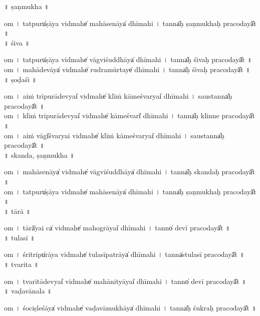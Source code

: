 \documentclass[parskip, DIV=14]{scrartcl}
\begin{document}
\vspace{0.201cm} ॥   ṣaṇmukha  ॥ \par
  om  । tatpuru̍ṣāya vi॒dmahe̍ mahāse॒nāya̍ dhīmahi  ।  tanna̍ḥ ṣaṇmukhaḥ praco॒dayā̎t ॥ \\

\vspace{0.201cm} ॥   śiva  ॥ \par
  om  । tatpuru̍ṣāya vi॒dmahe̍ vāgviśu॒ddhāya̍ dhīmahi  ।  tanna̍ḥ śivaḥ praco॒dayā̎t ॥ \\
  om  । ma॒hā॒de॒vāya̍ vi॒dmahe̍ rudramū॒rtaye̍ dhīmahi  ।  tanna̍ḥ śivaḥ praco॒dayā̎t ॥ \\

\vspace{0.201cm} ॥   ṣoḍaśī  ॥ \par
  om  । aiṁ tri॒pu॒rā॒devyai̍ vi॒dmahe̍ klīṁ kāme॒śvaryai̍ dhīmahi  ।  saustanna̍ḥ praco॒dayā̎t ॥ \\
  om  । klīṁ  tri॒pu॒rā॒devyai̍ vi॒dmahe̍ kāme॒śvarī̍ dhīmahi  ।  tanna̍ḥ klinne praco॒dayā̎t ॥ \\
  om  । aiṁ vāgī̍śvaryai vi॒dmahe̍ klīṁ  kāme॒śvaryai̍ dhīmahi  ।  saustanna̍ḥ praco॒dayā̎t ॥ \\

\vspace{0.201cm} ॥   skanda, ṣaṇmukha  ॥ \par
  om  । ma॒hā॒se॒nāya̍ vi॒dmahe̍ vāgviśu॒ddhāya̍ dhīmahi  ।  tanna̍ḥ skandaḥ praco॒dayā̎t ॥ \\
  om  । tatpuru̍ṣāya vi॒dmahe̍ mahāse॒nāya̍ dhīmahi  ।  tanna̍ḥ ṣaṇmukhaḥ praco॒dayā̎t ॥ \\

\vspace{0.201cm} ॥   tārā  ॥ \par
  om  । tārā̍yai ca̍ vi॒dmahe̍ maho॒grāyai̍ dhīmahi  ।  tanno̍ devī praco॒dayā̎t ॥ \\

\vspace{0.201cm} ॥   tulasī  ॥ \par
  om  । śrītripu̍rāya vi॒dmahe̍ tulasīpa॒trāya̍ dhīmahi  ।  tanna̍stulasī praco॒dayā̎t ॥ \\

\vspace{0.201cm} ॥   tvarita  ॥ \par
  om  । tva॒ri॒tā॒devyai̍ vi॒dmahe̍ mahāni॒tyāyai̍ dhīmahi  ।  tanno̍ devī praco॒dayā̎t ॥ \\

\vspace{0.201cm} ॥   vaḍavānala  ॥ \par
  om  । śo॒ci॒ṣle॒śāya̍ vi॒dmahe̍ vaḍavāmu॒khāya̍ dhīmahi  ।  tanna̍ḥ śukraḥ praco॒dayā̎t ॥ \\
\end{document}
